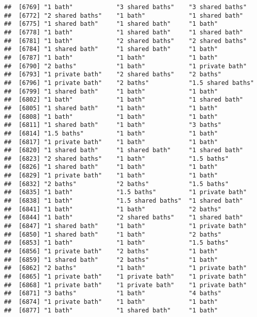 \documentclass[
]{article}
\begin{document}
\begin{verbatim}
##  [6769] "1 bath"            "3 shared baths"    "3 shared baths"   
##  [6772] "2 shared baths"    "1 bath"            "1 shared bath"    
##  [6775] "1 shared bath"     "1 shared bath"     "1 bath"           
##  [6778] "1 bath"            "1 shared bath"     "1 shared bath"    
##  [6781] "1 bath"            "2 shared baths"    "2 shared baths"   
##  [6784] "1 shared bath"     "1 shared bath"     "1 bath"           
##  [6787] "1 bath"            "1 bath"            "1 bath"           
##  [6790] "2 baths"           "1 bath"            "1 private bath"   
##  [6793] "1 private bath"    "2 shared baths"    "2 baths"          
##  [6796] "1 private bath"    "2 baths"           "1.5 shared baths" 
##  [6799] "1 shared bath"     "1 bath"            "1 bath"           
##  [6802] "1 bath"            "1 bath"            "1 shared bath"    
##  [6805] "1 shared bath"     "1 bath"            "1 bath"           
##  [6808] "1 bath"            "1 bath"            "1 bath"           
##  [6811] "1 shared bath"     "1 bath"            "3 baths"          
##  [6814] "1.5 baths"         "1 bath"            "1 bath"           
##  [6817] "1 private bath"    "1 bath"            "1 bath"           
##  [6820] "1 shared bath"     "1 shared bath"     "1 shared bath"    
##  [6823] "2 shared baths"    "1 bath"            "1.5 baths"        
##  [6826] "1 shared bath"     "1 bath"            "1 bath"           
##  [6829] "1 private bath"    "1 bath"            "1 bath"           
##  [6832] "2 baths"           "2 baths"           "1.5 baths"        
##  [6835] "1 bath"            "1.5 baths"         "1 private bath"   
##  [6838] "1 bath"            "1.5 shared baths"  "1 shared bath"    
##  [6841] "1 bath"            "1 bath"            "2 baths"          
##  [6844] "1 bath"            "2 shared baths"    "1 shared bath"    
##  [6847] "1 shared bath"     "1 bath"            "1 private bath"   
##  [6850] "1 shared bath"     "1 bath"            "2 baths"          
##  [6853] "1 bath"            "1 bath"            "1.5 baths"        
##  [6856] "1 private bath"    "2 baths"           "1 bath"           
##  [6859] "1 shared bath"     "2 baths"           "1 bath"           
##  [6862] "2 baths"           "1 bath"            "1 private bath"   
##  [6865] "1 private bath"    "1 private bath"    "1 private bath"   
##  [6868] "1 private bath"    "1 private bath"    "1 private bath"   
##  [6871] "3 baths"           "1 bath"            "4 baths"          
##  [6874] "1 private bath"    "1 bath"            "1 bath"           
##  [6877] "1 bath"            "1 shared bath"     "1 bath"           

\end{verbatim}
\end{document}
